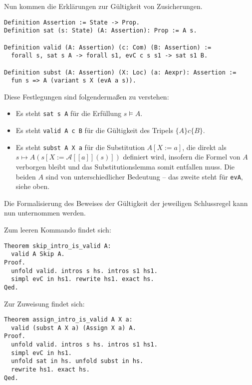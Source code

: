 \documentclass[8pt,fleqn,aspectratio=169]{beamer}
\newcommand{\parspace}{\vspace{0.8em}}
\newcommand{\code}[1]{{\texttt{#1}}}
\newcommand{\qb}[1]{[\!\![#1]\!\!]}
\newcommand{\evA}{\mathcal A}
\begin{document}
\begin{frame}[fragile]
Nun kommen die Erklärungen zur Gültigkeit von Zusicherungen.

\begin{lstlisting}[language=Coq, xleftmargin=\mathindent]
Definition Assertion := State -> Prop.
Definition sat (s: State) (A: Assertion): Prop := A s.

Definition valid (A: Assertion) (c: Com) (B: Assertion) :=
  forall s, sat s A -> forall s1, evC c s s1 -> sat s1 B.

Definition subst (A: Assertion) (X: Loc) (a: Aexpr): Assertion :=
  fun s => A (variant s X (evA a s)).
\end{lstlisting}

Diese Festlegungen sind folgendermaßen zu verstehen:
\begin{itemize}
\item Es steht \code{sat s A} für die Erfüllung $s\models A$.
\item Es steht \code{valid A c B} für die Gültigkeit des Tripels $\{A\}c\{B\}$.
\item Es steht \code{subst A X a} für die Substitution $A[X:=a]$, die direkt
als $s\mapsto A(s[X:=\evA\qb{a}(s)])$ definiert wird, insofern die Formel
von $A$ verborgen bleibt und das Substitutionslemma somit entfallen muss.
{\footnotesize Die beiden $A$ sind von unterschiedlicher Bedeutung --
das zweite steht für \code{evA}, siehe oben.}
\end{itemize}
\end{frame}

\begin{frame}[fragile]
Die Formalisierung des Beweises der Gültigkeit der jeweiligen Schlussregel
kann nun unternommen werden.

\parspace
Zum leeren Kommando findet sich:

\begin{small}
\begin{lstlisting}[language=Coq, xleftmargin=\mathindent]
Theorem skip_intro_is_valid A:
  valid A Skip A.
Proof.
  unfold valid. intros s hs. intros s1 hs1.
  simpl evC in hs1. rewrite hs1. exact hs.
Qed.
\end{lstlisting}
\end{small}

Zur Zuweisung findet sich:

\begin{small}
\begin{lstlisting}[language=Coq, xleftmargin=\mathindent]
Theorem assign_intro_is_valid A X a:
  valid (subst A X a) (Assign X a) A.
Proof.
  unfold valid. intros s hs. intros s1 hs1.
  simpl evC in hs1.
  unfold sat in hs. unfold subst in hs.
  rewrite hs1. exact hs.
Qed.
\end{lstlisting}
\end{small}
\end{frame}
\end{document}
